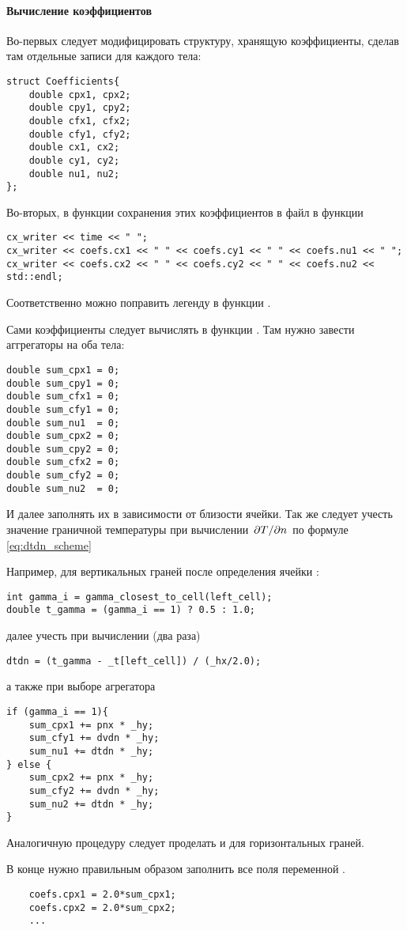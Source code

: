 \paragraph{Вычисление коэффициентов}
Во-первых следует модифицировать структуру, хранящую коэффициенты,
сделав там отдельные записи для каждого тела:
\begin{verbatim}
struct Coefficients{
	double cpx1, cpx2;
	double cpy1, cpy2;
	double cfx1, cfx2;
	double cfy1, cfy2;
	double cx1, cx2;
	double cy1, cy2;
	double nu1, nu2;
};
\end{verbatim}
Во-вторых, в функции сохранения этих коэффициентов в файл
в функции 
\begin{verbatim}
cx_writer << time << " ";
cx_writer << coefs.cx1 << " " << coefs.cy1 << " " << coefs.nu1 << " ";
cx_writer << coefs.cx2 << " " << coefs.cy2 << " " << coefs.nu2 << std::endl;
\end{verbatim}
Соответственно можно поправить легенду в функции .

Сами коэффициенты следует вычислять в функции .
Там нужно завести аггрегаторы на оба тела:
\begin{verbatim}
double sum_cpx1 = 0;
double sum_cpy1 = 0;
double sum_cfx1 = 0;
double sum_cfy1 = 0;
double sum_nu1  = 0;
double sum_cpx2 = 0;
double sum_cpy2 = 0;
double sum_cfx2 = 0;
double sum_cfy2 = 0;
double sum_nu2  = 0;
\end{verbatim}

И далее заполнять их в зависимости от близости ячейки.
Так же следует учесть значение граничной температуры
при вычислении $\left.\partial T\middle/\partial n\right.$ по формуле \cref{eq:dtdn_scheme}

Например, для вертикальных граней
после определения ячейки :
\begin{verbatim}
int gamma_i = gamma_closest_to_cell(left_cell);
double t_gamma = (gamma_i == 1) ? 0.5 : 1.0;
\end{verbatim}
далее учесть при вычислении  (два раза)
\begin{verbatim}
dtdn = (t_gamma - _t[left_cell]) / (_hx/2.0);
\end{verbatim}
а также при выборе агрегатора
\begin{verbatim}
if (gamma_i == 1){
	sum_cpx1 += pnx * _hy;
	sum_cfy1 += dvdn * _hy;
	sum_nu1 += dtdn * _hy;
} else {
	sum_cpx2 += pnx * _hy;
	sum_cfy2 += dvdn * _hy;
	sum_nu2 += dtdn * _hy;
}
\end{verbatim}

Аналогичную процедуру следует проделать и для горизонтальных граней.

В конце нужно правильным образом заполнить все поля
переменной .
\begin{verbatim}
	coefs.cpx1 = 2.0*sum_cpx1;
	coefs.cpx2 = 2.0*sum_cpx2;
	...
\end{verbatim}
